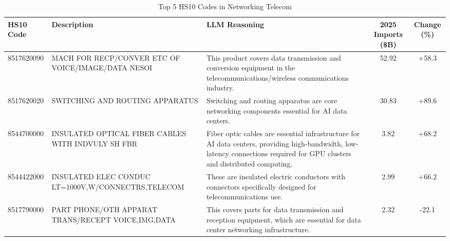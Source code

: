 \begin{table}[htbp]
\centering
\small
\caption{Top 5 HS10 Codes in Networking Telecom}
\label{tab:top5_networking_telecom}
\setlength{\tabcolsep}{1.25mm}
\renewcommand{\arraystretch}{1.80}
\begin{tabular}{lp{3.5cm}p{3.5cm}cc}
\toprule
HS10 Code & Description & LLM Reasoning & 2025 Imports (\$B) & Change (\%) \\
\midrule
8517620090 & {\footnotesize MACH FOR RECP/CONVER ETC OF VOICE/IMAGE/DATA NESOI} & {\footnotesize This product covers data transmission and conversion equipment in the telecommunications/wireless communications industry.} & 52.92 & +58.3 \\
8517620020 & {\footnotesize SWITCHING AND ROUTING APPARATUS} & {\footnotesize Switching and routing apparatus are core networking components essential for AI data centers.} & 30.83 & +89.6 \\
8544700000 & {\footnotesize INSULATED OPTICAL FIBER CABLES WITH INDVULY SH FBR} & {\footnotesize Fiber optic cables are essential infrastructure for AI data centers, providing high-bandwidth, low-latency connections required for GPU clusters and distributed computing.} & 3.82 & +68.2 \\
8544422000 & {\footnotesize INSULATED ELEC CONDUC LT=1000V,W/CONNECTRS,TELECOM} & {\footnotesize These are insulated electric conductors with connectors specifically designed for telecommunications use.} & 2.99 & +66.2 \\
8517790000 & {\footnotesize PART PHONE/OTH APPARAT TRANS/RECEPT VOICE,IMG,DATA} & {\footnotesize This covers parts for data transmission and reception equipment, which are essential for data center networking infrastructure.} & 2.32 & -22.1 \\
\bottomrule
\end{tabular}
\end{table}


